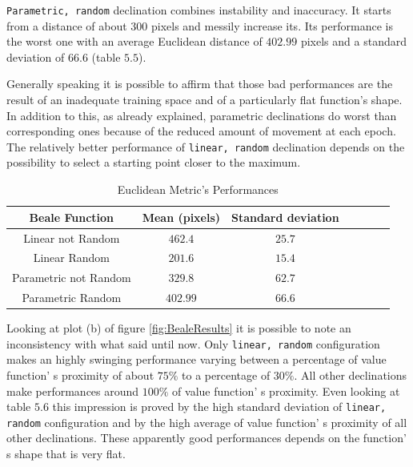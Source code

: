 {\tt Parametric, random} declination combines instability and inaccuracy. It starts from a distance of about $300$ pixels and messily increase its. Its performance is the worst one with an average Euclidean distance of $402.99$ pixels and a standard deviation of $66.6$ (table $5.5$).

Generally speaking it is possible to affirm that those bad performances are the result of an inadequate training space and of a particularly flat function's shape. In addition to this, as already explained, parametric declinations do worst than corresponding ones because of the reduced amount of movement at each epoch. The relatively better performance of {\tt linear, random} declination depends on the possibility to select a starting point closer to the maximum. \\

\begin{table}[h!]
\centering
\resizebox{\linewidth}{!} {
	\begin{tabular}{c| cccccc} 
		\hline \textbf{Beale Function}
		& \textbf{Mean (pixels)} & \textbf{Standard deviation} \\ 
		\hline Linear not Random
		& $462.4$ & $25.7$\\ 
		\hline Linear Random
		& \cellcolor{red!25}$201.6$ & \cellcolor{red!25}$15.4$\\ 
		\hline Parametric not Random
		& $329.8$ & $62.7$\\ 
		\hline Parametric Random
		& $402.99$ & $66.6$ \\ 
		\hline 
	\end{tabular} 
}
\label{BealeTabEuclidean}
\caption{Euclidean Metric's Performances}
\end{table}

Looking at plot (b) of figure \ref{fig:BealeResults} it is possible to note an inconsistency with what said until now. Only {\tt linear, random} configuration makes an highly swinging performance varying between a percentage of value function' s proximity of about $75\%$ to a percentage of $30\%$. All other declinations make performances around $100\%$ of value function' s proximity. Even looking at table $5.6$ this impression is proved by the high standard deviation of {\tt linear, random} configuration and by the high average of value function' s proximity of all other declinations. These apparently good performances depends on the function' s shape that is very flat. 

